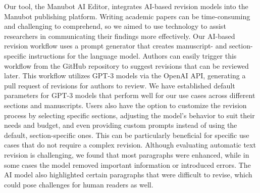 \documentclass[
]{article}
\begin{document}
Our tool, the Manubot AI Editor, integrates AI-based revision models into the Manubot publishing platform.
Writing academic papers can be time-consuming and challenging to comprehend, so we aimed to use technology to assist researchers in communicating their findings more effectively.
Our AI-based revision workflow uses a prompt generator that creates manuscript- and section-specific instructions for the language model.
Authors can easily trigger this workflow from the GitHub repository to suggest revisions that can be reviewed later.
This workflow utilizes GPT-3 models via the OpenAI API, generating a pull request of revisions for authors to review.
We have established default parameters for GPT-3 models that perform well for our use cases across different sections and manuscripts.
Users also have the option to customize the revision process by selecting specific sections, adjusting the model's behavior to suit their needs and budget, and even providing custom prompts instead of using the default, section-specific ones.
This can be particularly beneficial for specific use cases that do not require a complex revision.
Although evaluating automatic text revision is challenging, we found that most paragraphs were enhanced, while in some cases the model removed important information or introduced errors.
The AI model also highlighted certain paragraphs that were difficult to revise, which could pose challenges for human readers as well.
\end{document}
